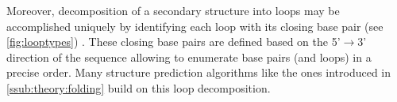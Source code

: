 \documentclass[../../master.tex]{subfiles}
\begin{document}
Moreover, decomposition of a secondary structure into loops may be accomplished uniquely by identifying each loop with its closing base pair (see \autoref{fig:looptypes}) \parencite{hofacker_combinatorics_1998}.
These closing base pairs are defined based on the 5'$\rightarrow$3' direction of the sequence allowing to enumerate base pairs (and loops) in a precise order.
Many structure prediction algorithms like the ones introduced in \autoref{ssub:theory:folding} build on this loop decomposition.
\end{document}
